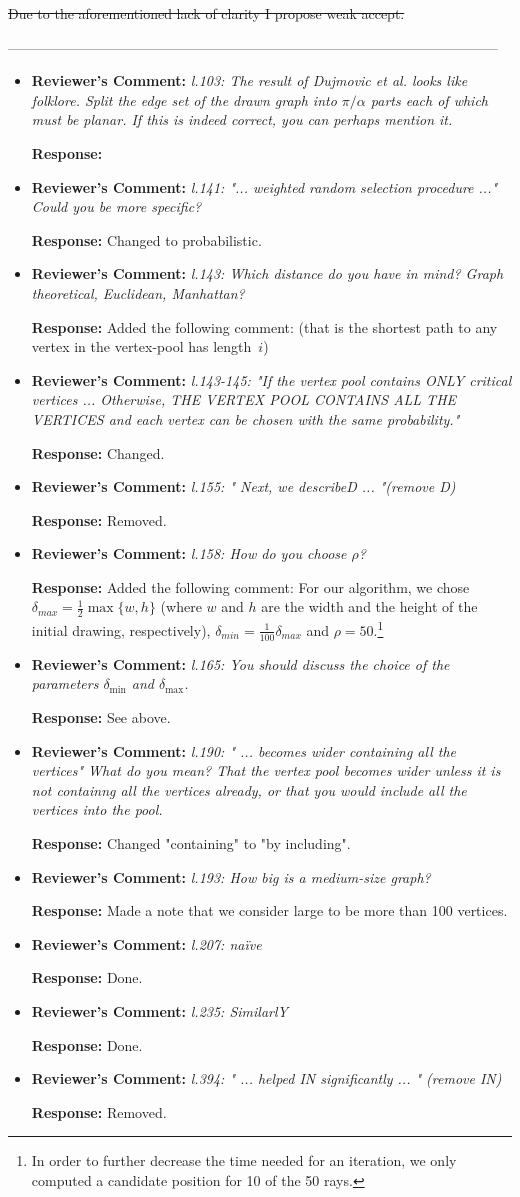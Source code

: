 \documentclass{article}
\newcommand{\rcomment}[1]{\vspace{0.3cm} \item \textbf{Reviewer's Comment:} {\em #1}}
\newcommand{\response}{\vspace{0.2cm} \textbf{Response: }}
\begin{document}
\st{Due to the aforementioned lack of clarity I propose weak accept.}


---------------------------------------------------------------------------------------------------------

\begin{itemize}

\rcomment{l.103: The result of Dujmovic et al. looks like folklore. Split the edge set of the drawn graph into $\pi/\alpha$ parts each of which must be planar. If this is indeed correct, you can perhaps mention it.}

\response{}

\rcomment{l.141: "... weighted random selection procedure ..." Could you be more specific?}

\response{Changed to probabilistic.}

\rcomment{l.143: Which distance do you have in mind? Graph theoretical, Euclidean, Manhattan?}

\response{Added the following comment: (that is the shortest path to any vertex in the vertex-pool has length~$i$)}

\rcomment{l.143-145: "If the vertex pool contains ONLY critical vertices ... Otherwise, THE VERTEX POOL CONTAINS ALL THE VERTICES and each vertex can be chosen with the same probability." }

\response{Changed.}

\rcomment{l.155: " Next, we describeD ...  "(remove D)}

\response{Removed.}

\rcomment{l.158: How do you choose $\rho$?}

\response{Added the following comment: For our algorithm, we chose $\delta_{max}=\frac{1}{2}\max\{w,h\}$ (where $w$ and $h$ are the width and the height of the initial drawing, respectively), $\delta_{min}=\frac{1}{100}\delta_{max}$ and $\rho=50$.\footnote{In order to further decrease the time needed for an iteration, we only computed a candidate position for 10 of the 50 rays.} }

\rcomment{l.165: You should discuss the choice of the parameters $\delta_{\min}$ and $\delta_{\max} $.}

\response{See above.}

\rcomment{l.190: " ... becomes wider containing all the vertices" What do you mean?  That the vertex pool becomes wider unless it is not containng all the vertices already, or that you would include all the vertices into the pool.}

\response{Changed "containing" to "by including".}

\rcomment{l.193: How big is a medium-size graph?}

\response{Made a note that we consider large to be more than 100 vertices.}

\rcomment{l.207: na\"ive}

\response{Done.}

\rcomment{l.235: SimilarlY}

\response{Done.}

\rcomment{l.394: " ... helped IN significantly ... " (remove IN)}

\response{Removed.}

\end{itemize}
\end{document}
